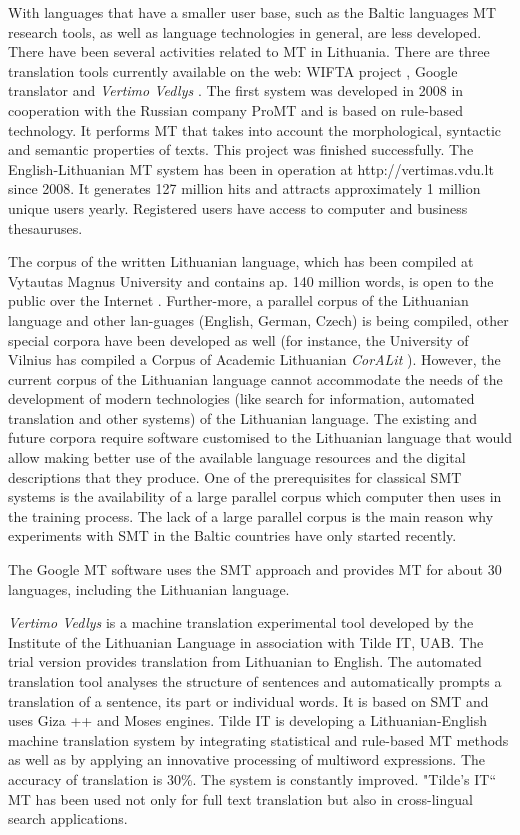 \begin{multicols}{2}
    With languages that have a smaller user base, such as the Baltic languages MT research tools, as well as language technologies in general, are less developed. There have been several activities related to MT in Lithuania. There are three translation tools currently available on the web: WIFTA project \cite{vertvdu},  Google translator and \textit{Vertimo Vedlys} \cite{mvlab}.  The first system was developed in 2008 in cooperation with the Russian company ProMT and is based on rule-based technology. It performs MT that takes into account the morphological, syntactic and semantic properties of texts. This project was finished successfully. The English-Lithuanian MT system has been in operation at http://vertimas.vdu.lt since 2008. It generates 127 million hits and attracts approximately 1 million unique users yearly. Registered users have access to computer and business thesauruses.

    The corpus of the written Lithuanian language, which has been compiled at Vytautas Magnus University and contains ap. 140 million words, is open to the public over the Internet \cite{tekstynas}.  Further-more, a parallel corpus of the Lithuanian language and other lan-guages (English, German, Czech) is being compiled, other special corpora have been developed as well (for instance, the University of Vilnius has compiled a Corpus of Academic Lithuanian \textit{CorALit} \cite{coralit}). However, the current corpus of the Lithuanian language cannot accommodate the needs of the development of modern technologies (like search for information, automated translation and other systems) of the Lithuanian language. The existing and future corpora require software customised to the Lithuanian language that would allow making better use of the available language resources and the digital descriptions that they produce. One of the prerequisites for classical SMT systems is the  availability of a large parallel corpus which computer then uses in the training process. The lack of a large parallel corpus is the main reason why experiments with SMT in the Baltic countries have only started recently.  

The Google MT software uses the SMT approach and provides MT for about 30 languages, including the Lithuanian language.

\textit{Vertimo Vedlys } is a machine translation experimental tool developed by the Institute of the Lithuanian Language in association with Tilde IT, UAB. The trial version provides translation from Lithuanian to English. The automated translation tool analyses the structure of sentences and automatically prompts a translation of a sentence, its part or individual words. It is based on SMT and uses Giza ++ and Moses engines. Tilde IT is developing a Lithuanian-English machine translation system by integrating statistical and rule-based MT methods as well as by applying an innovative processing of multiword expressions. The accuracy of translation is 30\%. The system is constantly improved. "Tilde's IT“ MT has been used not only for full text translation but also in cross-lingual search applications.


\end{multicols}
